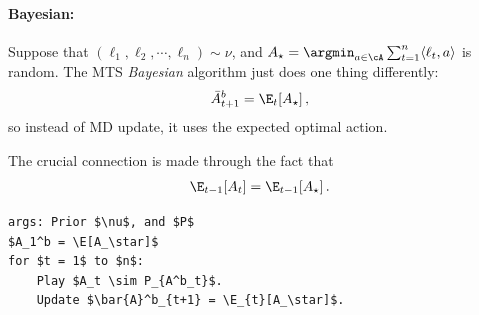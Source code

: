 \paragraph{Bayesian:}
Suppose that $(\ell_1, \ell_2, \cdots, \ell_n) \sim \nu$,
and $A_\star = \argmin_{a \in \cA} \sum_{t=1}^{n} \langle \ell_t, a\rangle$ is random.
The \textsf{MTS} \textit{Bayesian} algorithm just does one thing differently:
\begin{align*}
    \bar{A}^b_{t+1} = \E_{t}[A_\star]\,,
\end{align*}
so instead of \textsf{MD} update, it uses the expected optimal action.

The crucial connection is made through the fact that
\begin{align*}
    \E_{t-1}[A_t] = \E_{t-1}[A_\star]\,.
\end{align*}


\begin{algorithm}[h!]
    \begin{minipage}{8cm}
        \begin{mdframed}
            \begin{lstlisting}
args: Prior $\nu$, and $P$
$A_1^b = \E[A_\star]$
for $t = 1$ to $n$:
    Play $A_t \sim P_{A^b_t}$.
    Update $\bar{A}^b_{t+1} = \E_{t}[A_\star]$.
\end{lstlisting}
            \caption{MTS}\label{alg:MTS}
        \end{mdframed}
    \end{minipage}
\end{algorithm}

